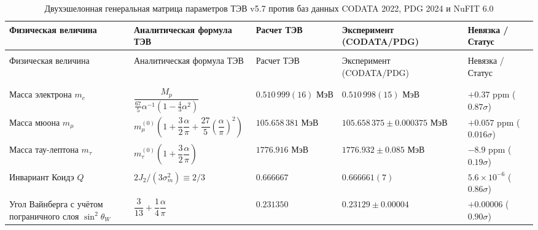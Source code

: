 \documentclass[11pt,a4paper]{article}
\theoremstyle{definition}
\theoremstyle{remark}
\begin{document}
\begin{xltabular}{\textwidth}{
>{\raggedright\arraybackslash}p{3.8cm}
>{\centering\arraybackslash}X
>{\centering\arraybackslash}p{2.7cm}
>{\centering\arraybackslash}p{2.8cm}
>{\centering\arraybackslash}p{2.0cm}
}
\caption{Двухэшелонная генеральная матрица параметров ТЭВ v5.7 против баз данных CODATA 2022, PDG 2024 и NuFIT 6.0}
\label{tab:grand_master_verification_v57} \\
\toprule
Физическая величина & Аналитическая формула ТЭВ & Расчет ТЭВ & Эксперимент (CODATA/PDG) & Невязка / Статус \\
\midrule
\endfirsthead
{} \\
\toprule
Физическая величина & Аналитическая формула ТЭВ & Расчет ТЭВ & Эксперимент (CODATA/PDG) & Невязка / Статус \\
\midrule
\endhead
\midrule
{} \\
\bottomrule
\endfoot
\bottomrule
\endlastfoot

 \\
\midrule

Масса электрона $m_e$ & $\dfrac{M_p}{\frac{67}{5}\alpha^{-1}\left(1 - \frac{4}{3}\alpha^2\right)}$ & $0.510\,999(16)\text{ МэВ}$ & $0.510\,998(15)\text{ МэВ}$ & $+0.37\text{ ppm}$ ($0.87\sigma$) \\

Масса мюона $m_\mu$ & $m_\mu^{(0)} \left(1 + \dfrac{3}{2}\dfrac{\alpha}{\pi} + \dfrac{27}{5}\left(\dfrac{\alpha}{\pi}\right)^2\right)$ & $105.658\,381\text{ МэВ}$ & $105.658\,375 \pm 0.000375\text{ МэВ}$ & $+0.057\text{ ppm}$ ($0.016\sigma$) \\

Масса тау-лептона $m_\tau$ & $m_\tau^{(0)} \left(1 + \dfrac{3}{2}\dfrac{\alpha}{\pi}\right)$ & $1776.916\text{ МэВ}$ & $1776.932 \pm 0.085\text{ МэВ}$ & $-8.9\text{ ppm}$ ($0.19\sigma$) \\

Инвариант Коидэ $Q$ & $2J_2 / (3\sigma_m^2) \equiv 2/3$ & $0.666667$ & $0.666661(7)$ & $5.6 \times 10^{-6}$ ($0.86\sigma$) \\

Угол Вайнберга с учётом пограничного слоя $\sin^2\theta_W$ & $\dfrac{3}{13} + \dfrac{1}{4}\dfrac{\alpha}{\pi}$ & $0.231350$ & $0.23129 \pm 0.00004$ & $+0.00006$ ($0.90\sigma$) \\


\end{xltabular}
\end{document}
